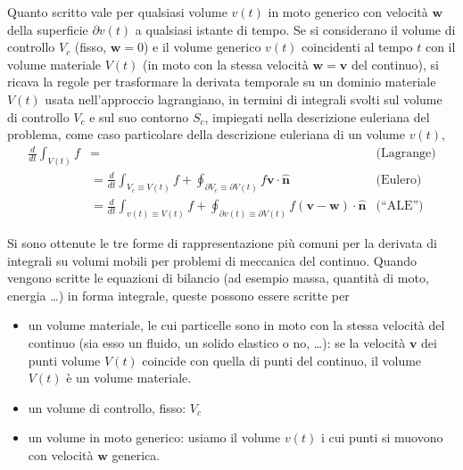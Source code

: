 \noindent
Quanto scritto vale per qualsiasi volume $v(t)$ in moto generico con velocità $\bm{w}$ della superficie $\partial v(t)$
 a qualsiasi istante di tempo. Se si considerano il volume di controllo $V_c$
 (fisso, $\bm{w}=0$) e il volume generico $v(t)$ coincidenti al tempo $t$ con
 il volume materiale $V(t)$ (in moto con la stessa velocità $\bm{w}=\bm{v}$
 del continuo), si ricava la regole per trasformare la derivata temporale su un dominio materiale $V(t)$ usata nell'approccio lagrangiano, in termini di integrali svolti sul volume di controllo $V_c$ e sul suo contorno $S_c$, impiegati nella descrizione euleriana del problema, come caso particolare della descrizione euleriana di un volume $v(t)$, 
\begin{equation}
\begin{aligned}
 \frac{d}{dt} \int_{V(t)} f  & =  & \text{(Lagrange)} \\
    & = \frac{d}{dt} \int_{V_c \equiv V(t)} f  + \oint_{\partial V_c \equiv \partial V(t)} f\bm{v} \cdot \bm{\hat{n}}            & \text{(Eulero)} \\
    & = \frac{d}{dt} \int_{v(t)\equiv V(t)} f  + \oint_{\partial v(t)\equiv \partial V(t)} f(\bm{v}-\bm{w}) \cdot \bm{\hat{n}}   & \text{(``ALE'')} 
\end{aligned}
\end{equation}


\noindent
Si sono ottenute le tre forme di rappresentazione più comuni per la derivata di integrali su volumi mobili per problemi di meccanica del continuo.
Quando vengono scritte le equazioni di bilancio (ad esempio massa, quantità di moto, energia \dots) in forma integrale, queste possono essere scritte
 per
\begin{itemize}
 \item un volume materiale, le cui particelle sono in moto con la stessa velocità del continuo (sia esso un fluido, un solido elastico o no, \dots):
   se la velocità $\bm{v}$ dei punti volume $V(t)$ coincide con quella di punti del continuo, il volume $V(t)$ è un volume materiale.
 \item un volume di controllo, fisso: $V_c$
 \item un volume in moto generico: usiamo il volume $v(t)$ i cui punti si muovono con velocità $\bm{w}$ generica.
\end{itemize}

